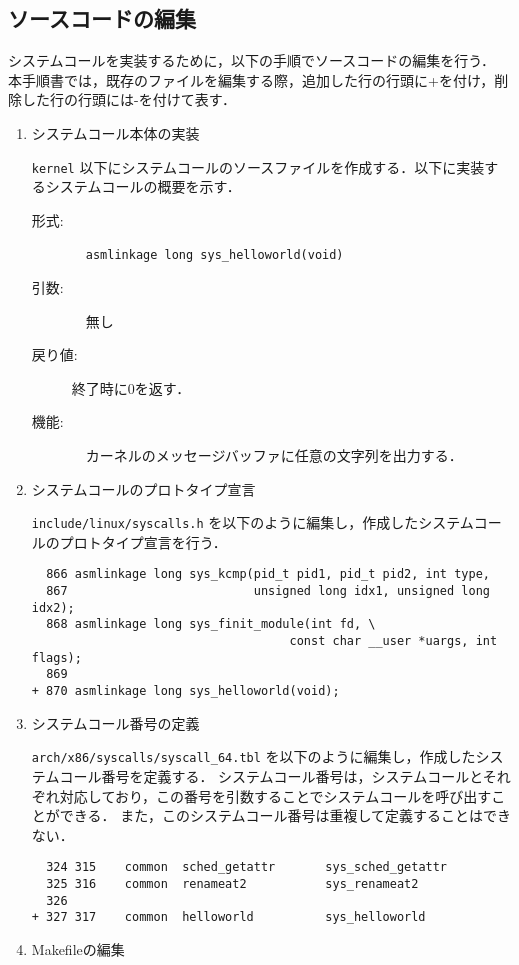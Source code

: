 \documentclass[12pt]{jsarticle}
\begin{document}
\subsection{ソースコードの編集}
システムコールを実装するために，以下の手順でソースコードの編集を行う．
本手順書では，既存のファイルを編集する際，追加した行の行頭に+を付け，削除した行の行頭には-を付けて表す．
\begin{enumerate}

\item システムコール本体の実装

\verb|kernel| 以下にシステムコールのソースファイルを作成する．以下に実装するシステムコールの概要を示す．
\begin{description}
\item[形式:]　\verb|asmlinkage long sys_helloworld(void)|

\item[引数:] 　無し

\item [戻り値:] 終了時に0を返す．

\item [機能:] 　カーネルのメッセージバッファに任意の文字列を出力する．

\end{description}

\item システムコールのプロトタイプ宣言

\verb|include/linux/syscalls.h| を以下のように編集し，作成したシステムコールのプロトタイプ宣言を行う．
\begin{verbatim}
  866 asmlinkage long sys_kcmp(pid_t pid1, pid_t pid2, int type,
  867                          unsigned long idx1, unsigned long idx2);
  868 asmlinkage long sys_finit_module(int fd, \ 
                                    const char __user *uargs, int flags);
  869
+ 870 asmlinkage long sys_helloworld(void);
\end{verbatim}
\item システムコール番号の定義

\verb|arch/x86/syscalls/syscall_64.tbl| を以下のように編集し，作成したシステムコール番号を定義する．
システムコール番号は，システムコールとそれぞれ対応しており，この番号を引数することでシステムコールを呼び出すことができる．
また，このシステムコール番号は重複して定義することはできない．
\begin{verbatim}
  324 315    common  sched_getattr       sys_sched_getattr
  325 316    common  renameat2           sys_renameat2
  326
+ 327 317    common  helloworld          sys_helloworld
\end{verbatim}
\item Makefileの編集


\end{enumerate}
\end{document}
